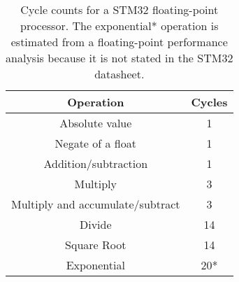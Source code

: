 \begin{table}[]
\centering
\caption{Cycle counts for a STM32 floating-point processor.  The exponential* operation is estimated from a floating-point performance analysis \cite{flops_performance} because it is not stated in the STM32 datasheet.}
\label{t:stm32_cycles}
\vspace*{0.2in}
\begin{tabular}{|c|c|}
\rowcolor[HTML]{EFEFEF} 
\hline
\textbf{Operation} & \textbf{Cycles} \\ \hline
Absolute value & 1 \\ \hline
Negate of a float & 1 \\ \hline
Addition/subtraction & 1 \\ \hline
Multiply & 3 \\ \hline
Multiply and accumulate/subtract & 3 \\ \hline
Divide & 14 \\ \hline
Square Root & 14 \\ \hline
Exponential & 20* \\ \hline
\end{tabular}
\end{table}

